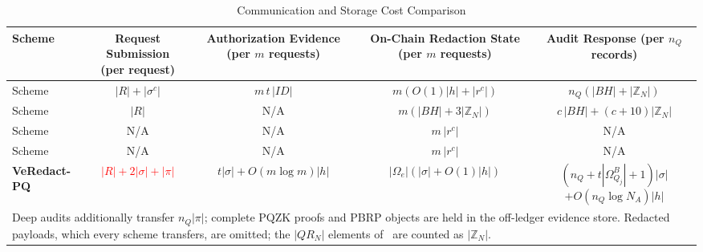 \documentclass[lettersize,journal]{IEEEtran}
\begin{document}
    \begin{table}[t]
    \centering
    \caption{Communication and Storage Cost Comparison}
    \label{tab:comm-cost}
    \footnotesize
    \renewcommand{\arraystretch}{1.25}
    \setlength{\tabcolsep}{4pt}
    \begin{tabular}{lcccc}
    \toprule
    \textbf{Scheme} &
    \makecell{\textbf{Request Submission}\\\textbf{(per request)}} &
    \makecell{\textbf{Authorization Evidence}\\\textbf{(per $m$ requests)}} &
    \makecell{\textbf{On-Chain Redaction State}\\\textbf{(per $m$ requests)}} &
    \makecell{\textbf{Audit Response}\\\textbf{(per $n_Q$ records)}} \\
    \midrule
    Scheme~\cite{ref1}
    & $|R|+|\sigma^{c}|$ & $m\,t\,|ID|$ & $m(O(1)|h|+|r^{c}|)$ & $n_Q(|BH|+|\mathbb{Z}_N|)$ \\
    Scheme~\cite{ref13}
    & $|R|$ & N/A & $m(|BH|+3|\mathbb{Z}_N|)$ & $c\,|BH|+(c+10)|\mathbb{Z}_N|$ \\
    Scheme~\cite{ref27}
    & N/A & N/A & $m\,|r^{c}|$ & N/A \\
    Scheme~\cite{ref34}
    & N/A & N/A & $m\,|r^{c}|$ & N/A \\
    \midrule
    \textbf{VeRedact-PQ}
    & \textcolor{red}{$|R|+2|\sigma|+|\pi|$}
    & $t|\sigma|+O(m\log m)|h|$
    & $|\Omega_e|(|\sigma|+O(1)|h|)$
    & \makecell{$(n_Q+t|\Omega_{Q_j}^B|+1)|\sigma|$\\$+O(n_Q\log N_A)|h|$} \\
    \bottomrule
    \multicolumn{5}{p{0.96\textwidth}}{\footnotesize Deep audits additionally transfer $n_Q|\pi|$; complete PQZK proofs and PBRP objects are held in the off-ledger evidence store.
    Redacted payloads, which every scheme transfers, are omitted; the $|QR_N|$ elements of~\cite{ref13} are counted as $|\mathbb{Z}_N|$.}
    \end{tabular}
    \end{table}
    
\end{document}
